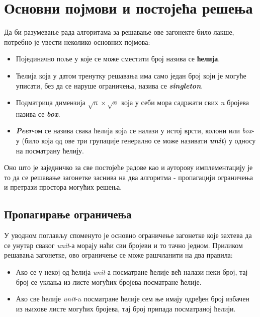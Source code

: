 \section{Основни појмови и постојећа решења}

Да би разумевање рада алгоритама за решавање ове загонекте било лакше, потребно је увести неколико основних појмова:

\begin{itemize}
    \item Појединачно поље у које се може сместити број назива се \textbf{ћелија}.
    
    \item Ћелија која у датом тренутку решавања има само један број који је могуће уписати, без да се наруше ограничења, назива се \textbf{\textit{singleton}}.
    
    \item Подматрица димензија \(\sqrt{n} \times \sqrt{n}\) која у себи мора садржати свих \textit{n} бројева назива се \textbf{\textit{box}}.
    
    \item \textbf{\textit{Peer}}-ом се назива свака ћелија којa се налази у истој врсти, колони или \textit{box}-у (било која од ове три групације генерално се може називати \textbf{\textit{unit}}) у односу на посматрану ћелију.
\end{itemize}


Оно што је заједничко за све постојеће радове \cite{sudokuMulti,sudokuReport,sudokuMPI} као и ауторову имплементацију је то да се решавање загонетке заснива на два алгоритма - пропагацији ограничења и претрази простора могућих решења.

\subsection{Пропагирање ограничења}\label{sec:constraint_propagation}
У уводном поглављу споменуто је основно ограничење загонетке које захтева да се унутар сваког \textit{unit}-а морају наћи сви бројеви и то тачно једном. Приликом решавања загонетке, ово ограничење се може рашчланити на два правила:
\begin{itemize}\label{rules}
    \item Ако се у некој од ћелија \textit{unit}-а посматране ћелије већ налази неки број, тај број се уклања из листе могућих бројева посматране  ћелије.
    \item Ако све ћелије \textit{unit}-a посматране ћелије сем ње имају одређен број избачен из њихове листе могућих бројева, тај број припада посматраној ћелији.
\end{itemize}

